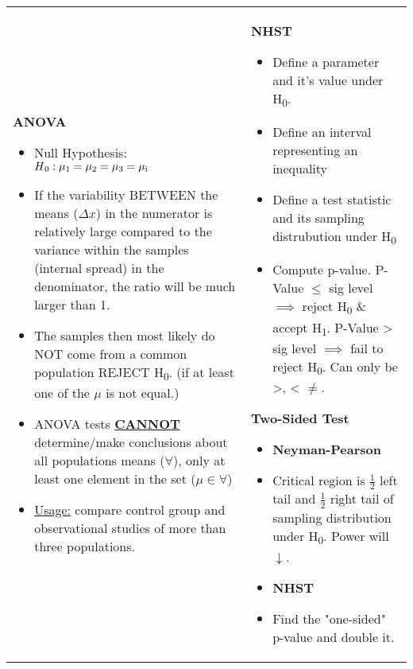 \documentclass[6pt]{article}
\begin{document}
\begin{scriptsize}
\begin{tabular}{l | l}
{\begin{flushleft}
\textbf{ANOVA}
\end{flushleft}
\begin{itemize}
\item Null Hypothesis: $H\textsubscript{0}: \mu\textsubscript{1} = \mu\textsubscript{2} = \mu\textsubscript{3} = \mu\textsubscript{i}$
\item If the variability BETWEEN the means ($\Delta x$) in the numerator is relatively large compared to the variance within the samples (internal spread) in the denominator, the ratio will be much larger than 1.
\item The samples then most likely do NOT come from a common population REJECT H\textsubscript{0}. (if at least one of the $\mu$ is not equal.)
\item ANOVA tests \underline{\textbf{CANNOT}} determine/make conclusions about all populations means ($\forall$), only at least one element in the set ($\mu \in \forall$)
\item \underline{Usage:} compare control group and observational studies of more than three populations.
\end{itemize}
}

&

\parbox{0.5\textwidth}{
\begin{normalsize}
\textbf{NHST}
\end{normalsize}
\begin{flushright}
\begin{itemize}

\item Define a parameter and it's value under H\textsubscript{0}.
\item Define an interval representing an inequality
\item Define a test statistic and its sampling distrubution under H\textsubscript{0}
\item Compute p-value. P-Value $\le$ sig level $\implies$ reject H\textsubscript{0} \& accept H\textsubscript{1}. P-Value > sig level $\implies$ fail to reject H\textsubscript{0}. Can only be >, < $\ne$.

\end{itemize}
\end{flushright}
\begin{normalsize}
\textbf{Two-Sided Test}
\end{normalsize}
\begin{flushright}
\begin{itemize}
\item \textbf{Neyman-Pearson}
\item Critical region is $\frac{1}{2}$ left tail and $\frac{1}{2}$ right tail of sampling distribution under H\textsubscript{0}. Power will $\downarrow$.
\item \textbf{NHST}
\item Find the "one-sided" p-value and double it.
\end{itemize}


\end{flushright}}
\end{tabular}
\end{scriptsize}
\end{document}
